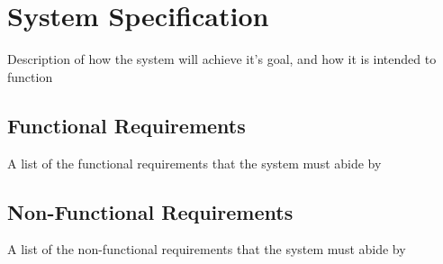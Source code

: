 \section{System Specification}
\label{sec:spec}
{\color{red} Description of how the system will achieve it's goal, and how it is intended to function}

\subsection{Functional Requirements}
{\color{red} A list of the functional requirements that the system must abide by}

\subsection{Non-Functional Requirements}
{\color{red} A list of the non-functional requirements that the system must abide by}